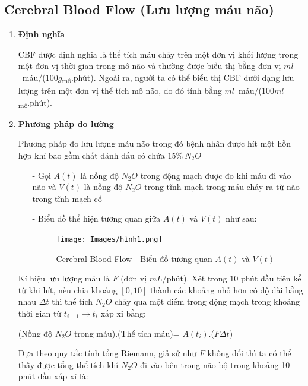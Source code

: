 \documentclass[12pt,a4paper]{article}
\begin{document}
\subsection{Cerebral Blood Flow (Lưu lượng máu não)}
\begin{enumerate}[a/]
	\item \textbf{Định nghĩa}
	      \begin{flushleft}
		      CBF được định nghĩa là thể tích máu chảy trên một đơn vị khối lượng trong
		      một đơn vị thời gian trong mô não và thường được biểu thị bằng đơn vị $ml$\ máu/($100g$\textsubscript{mô}.phút).
		      Ngoài ra, người ta có thể biểu thị CBF dưới dạng lưu lượng trên một đơn vị thể tích mô não,
		      do đó tính bằng $ml$\ máu/($100ml$\textsubscript{mô}.phút).
	      \end{flushleft}
	\item \textbf{Phương pháp đo lường}
	      \begin{flushleft}
		      Phương pháp đo lưu lượng máu não trong đó bệnh nhân được
		      hít một hỗn hợp khí bao gồm chất đánh dấu có chứa $15\%\ N_2O$
		      \begin{itemize}
			      \item[-] 	Gọi $A(t)$ là nồng độ $N_2O$ trong động mạch được đo khi máu đi vào não và $V(t)$ là nồng độ $N_2O$ trong tĩnh mạch trong máu chảy ra từ não trong tĩnh mạch cổ
			      \item[-] 	Biểu đồ thể hiện tương quan giữa $A(t)$ và $V(t)$ như sau:
			            \begin{figure} [ht]
				            \centering
				            \texttt{[image: Images/hình1.png]}
				            \caption{Cerebral Blood Flow - Biểu đồ tương quan $A(t)$ và $V(t)$}
				            \label{enter-label}
			            \end{figure}
		      \end{itemize}
		      Kí hiệu lưu lượng máu là $F$ (đơn vị $mL$/phút). Xét trong $10$ phút đầu tiên
		      kể từ khi hít, nếu chia khoảng $\left[0,10\right]$ thành các khoảng nhỏ hơn có độ dài bằng nhau $\Delta t$ thì
		      thể tích $N_2O$ chảy qua một điểm trong động mạch trong khoảng thời gian từ $t_{i-1} \to t_i$ xấp xỉ bằng:
	      \end{flushleft}
	      \begin{center}
		      (Nồng độ $N_2O$ trong máu).(Thể tích máu)= $A(t_i)$.($F \Delta t$)
	      \end{center}
	      \begin{flushleft}
		      Dựa theo quy tắc tính tổng Riemann, giả sử như $F$ không đổi thì ta có thể thấy được tổng thể tích khí $N_2O$ đi vào bên trong não bộ trong khoảng 10 phút đầu xấp xỉ là:

\end{flushleft}
\end{enumerate}
\end{document}
